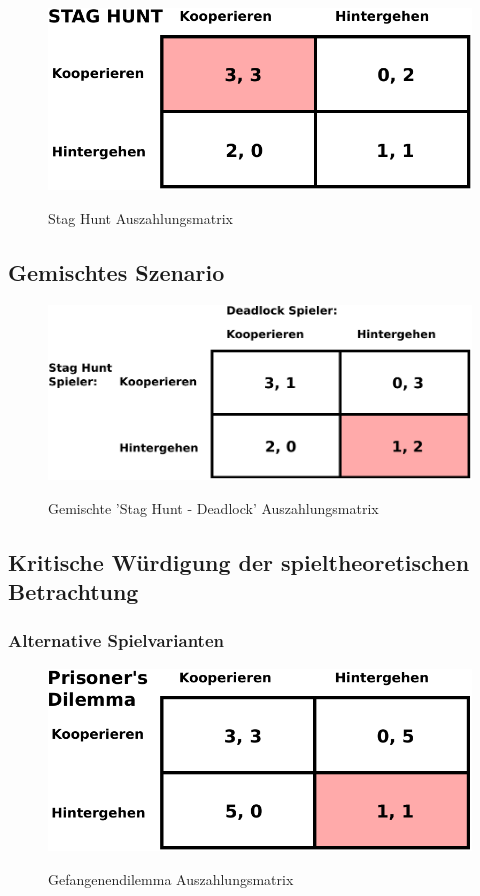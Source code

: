 

\begin{figure}%
\centering
\caption{Stag Hunt Auszahlungsmatrix}
\includegraphics[scale=0.8]{Grafiken/Stag_Hunt_Ink.pdf} 
\label{pic:StagHunt}
\end{figure}

\subsection{Gemischtes Szenario}
\begin{figure}%
\centering
\caption{Gemischte 'Stag Hunt - Deadlock' Auszahlungsmatrix}
\includegraphics[scale=0.8]{Grafiken/Mixed_Ink.pdf} 
\label{pic:Mixed}
\end{figure}

\subsection{Kritische Würdigung der spieltheoretischen Betrachtung}

\subsubsection{Alternative Spielvarianten}


\begin{figure}%
\centering
\caption{Gefangenendilemma Auszahlungsmatrix}
\includegraphics[scale=0.8]{Grafiken/Prisoner_Ink.pdf} 
\label{pic:Prisoner}
\end{figure}